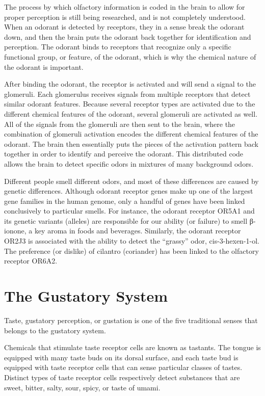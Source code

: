 The process by which olfactory information is coded in the brain to allow for proper perception is still being researched, and is not completely understood. When an odorant is detected by receptors, they in a sense break the odorant down, and then the brain puts the odorant back together for identification and perception. The odorant binds to receptors that recognize only a specific functional group, or feature, of the odorant, which is why the chemical nature of the odorant is important.

After binding the odorant, the receptor is activated and will send a signal to the glomeruli. Each glomerulus receives signals from multiple receptors that detect similar odorant features. Because several receptor types are activated due to the different chemical features of the odorant, several glomeruli are activated as well. All of the signals from the glomeruli are then sent to the brain, where the combination of glomeruli activation encodes the different chemical features of the odorant. The brain then essentially puts the pieces of the activation pattern back together in order to identify and perceive the odorant. This distributed code allows the brain to detect specific odors in mixtures of many background odors.

Different people smell different odors, and most of these differences are caused by genetic differences. Although odorant receptor genes make up one of the largest gene families in the human genome, only a handful of genes have been linked conclusively to particular smells. For instance, the odorant receptor OR5A1 and its genetic variants (alleles) are responsible for our ability (or failure) to smell β-ionone, a key aroma in foods and beverages. Similarly, the odorant receptor OR2J3 is associated with the ability to detect the ``grassy'' odor, cis-3-hexen-1-ol. The preference (or dislike) of cilantro (coriander) has been linked to the olfactory receptor OR6A2.

\hypertarget{the-gustatory-system}{%
\chapter{The Gustatory System}\label{the-gustatory-system}}

Taste, gustatory perception, or gustation is one of the five traditional senses that belongs to the gustatory system.

Chemicals that stimulate taste receptor cells are known as tastants. The tongue is equipped with many taste buds on its dorsal surface, and each taste bud is equipped with taste receptor cells that can sense particular classes of tastes. Distinct types of taste receptor cells respectively detect substances that are sweet, bitter, salty, sour, spicy, or taste of umami.

